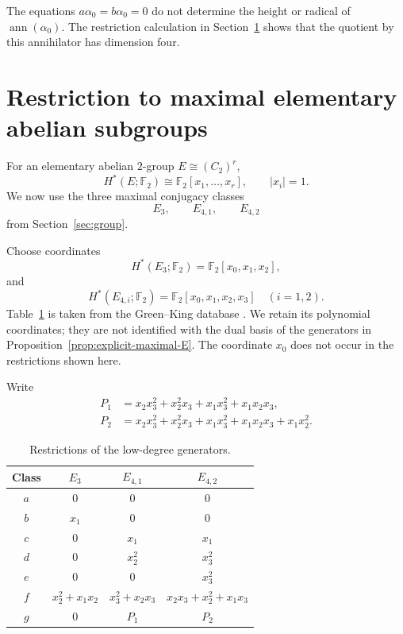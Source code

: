 \documentclass[11pt]{amsart}
\theoremstyle{definition}
\theoremstyle{remark}
\DeclareMathOperator{\ann}{ann}
\newcommand{\F}{\mathbb F}
\begin{document}
The equations $a\alpha_0=b\alpha_0=0$ do not determine the height or radical of $\ann(\alpha_0)$.  The restriction calculation in Section~\ref{sec:detection} shows that the quotient by this annihilator has dimension four.
\section{Restriction to maximal elementary abelian subgroups}
\label{sec:detection}

For an elementary abelian \(2\)-group \(E\cong(C_2)^r\),
\[
H^*(E;\F_2)\cong\F_2[x_1,\dots,x_r],
\qquad |x_i|=1.
\]
We now use the three maximal conjugacy classes
\[
E_3,\qquad E_{4,1},\qquad E_{4,2}
\]
from Section~\ref{sec:group}.

Choose coordinates
\[
H^*(E_3;\F_2)=\F_2[x_0,x_1,x_2],
\]
and
\[
H^*(E_{4,i};\F_2)=\F_2[x_0,x_1,x_2,x_3]
\quad(i=1,2).
\]
Table~\ref{tab:restrictions} is taken from the Green--King database \cite{GreenKingDatabase}.  We retain its polynomial coordinates; they are not identified with the dual basis of the generators in Proposition~\ref{prop:explicit-maximal-E}.  The coordinate \(x_0\) does not occur in the restrictions shown here.

Write
\begin{align}
P_1&=x_2x_3^2+x_2^2x_3+x_1x_3^2+x_1x_2x_3,\label{eq:P1}\\
P_2&=x_2x_3^2+x_2^2x_3+x_1x_3^2+x_1x_2x_3+x_1x_2^2.\label{eq:P2}
\end{align}
\begin{table}[ht]
\centering
\caption{Restrictions of the low-degree generators.}
\label{tab:restrictions}
\small
\renewcommand{\arraystretch}{1.2}
\begin{tabular}{@{}cccc@{}}
\toprule
Class & \(E_3\) & \(E_{4,1}\) & \(E_{4,2}\) \\
\midrule
\(a\) & \(0\) & \(0\) & \(0\) \\
\(b\) & \(x_1\) & \(0\) & \(0\) \\
\(c\) & \(0\) & \(x_1\) & \(x_1\) \\
\(d\) & \(0\) & \(x_2^2\) & \(x_3^2\) \\
\(e\) & \(0\) & \(0\) & \(x_3^2\) \\
\(f\) & \(x_2^2+x_1x_2\) & \(x_3^2+x_2x_3\) & \(x_2x_3+x_2^2+x_1x_3\) \\
\(g\) & \(0\) & \(P_1\) & \(P_2\) \\
\bottomrule
\end{tabular}
\end{table}
\end{document}

